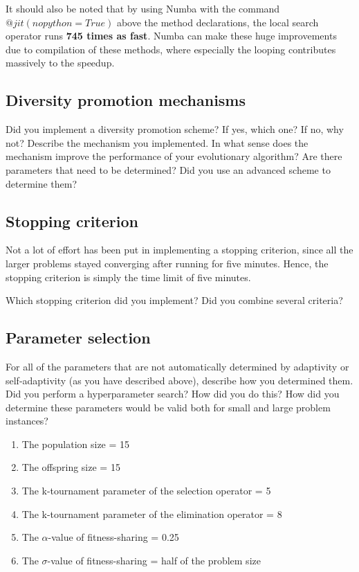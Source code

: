 \documentclass[a4paper,10pt]{article}
\newcommand{\ReplaceMe}[1]{{\color{blue}#1}}
\begin{document}
It should also be noted that by using Numba with the command $@jit(nopython=True)$ above the method declarations, the local search operator runs \textbf{745 times as fast}. Numba can make these huge improvements due to compilation of these methods, where especially the looping contributes massively to the speedup.


\subsection{Diversity promotion mechanisms}
\label{diversity_promotion}
\ReplaceMe{Did you implement a diversity promotion scheme? If yes, which one? If no, why not? Describe the mechanism you implemented. In what sense does the mechanism improve the performance of your evolutionary algorithm? Are there parameters that need to be determined? Did you use an advanced scheme to determine them?}

\subsection{Stopping criterion}
Not a lot of effort has been put in implementing a stopping criterion, since all the larger problems stayed converging after running for five minutes. Hence, the stopping criterion is simply the time limit of five minutes.

\ReplaceMe{Which stopping criterion did you implement? Did you combine several criteria?}

\subsection{Parameter selection}

\ReplaceMe{For all of the parameters that are not automatically determined by adaptivity or self-adaptivity (as you have described above), describe how you determined them. Did you perform a hyperparameter search? How did you do this? How did you determine these parameters would be valid both for small and large problem instances?}

\begin{enumerate}
    \item The population size = 15
    \item The offspring size = 15
    \item The k-tournament parameter of the selection operator = 5 
    \item The k-tournament parameter of the elimination operator = 8
    \item The $\alpha$-value of fitness-sharing = 0.25
    \item The $\sigma$-value of fitness-sharing = half of the problem size
\end{enumerate}
\end{document}
